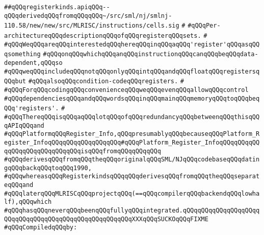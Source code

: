 \label{src/lib/compiler/back/low/code/registerkinds.api}
\verb|##qQQqregisterkinds.apiqQQq--qQQqderivedqQQqfromqQQqqQQq~/src/sml/nj/smlnj-110.58/new/new/src/MLRISC/instructions/cells.sig|\newline
\verb|#|\newline
\verb|#qQQqPer-architectureqQQqdescriptionqQQqofqQQqregisterqQQqsets.|\newline
\verb|#|\newline
\verb|#qQQqWeqQQqareqQQqinterestedqQQqhereqQQqinqQQqaqQQq'register'qQQqasqQQqsomething|\newline
\verb|#qQQqonqQQqwhichqQQqanqQQqinstructionqQQqcanqQQqbeqQQqdata-dependent,qQQqso|\newline
\verb|#qQQqweqQQqincludeqQQqnotqQQqonlyqQQqintqQQqandqQQqfloatqQQqregistersqQQqbut|\newline
\verb|#qQQqalsoqQQqcondition-codeqQQqregisters.|\newline
\verb|#|\newline
\verb|#qQQqForqQQqcodingqQQqconvenienceqQQqweqQQqevenqQQqallowqQQqcontrol|\newline
\verb|#qQQqdependenciesqQQqandqQQqwordsqQQqinqQQqmainqQQqmemoryqQQqtoqQQqbeqQQq'registers'.|\newline
\verb|#|\newline
\verb|#qQQqThereqQQqisqQQqaqQQqlotqQQqofqQQqredundancyqQQqbetweenqQQqthisqQQqAPIqQQqand|\newline
\verb|#qQQqPlatformqQQqRegister_Info,qQQqpresumablyqQQqbecauseqQQqPlatform_Register_InfoqQQqqQQqqQQqqQQqqQQq#qQQqPlatform_Register_InfoqQQqqQQqqQQqqQQqqQQqqQQqqQQqqQQqisqQQqfromqQQqqQQqqQQq|\newline
\verb|#qQQqderivesqQQqfromqQQqtheqQQqoriginalqQQqSML/NJqQQqcodebaseqQQqdatingqQQqbackqQQqtoqQQq1990,|\newline
\verb|#qQQqwhereasqQQqRegisterkindsqQQqqQQqderivesqQQqfromqQQqtheqQQqseparateqQQqand|\newline
\verb|#qQQqlaterqQQqMLRISCqQQqprojectqQQq(==qQQqcompilerqQQqbackendqQQqlowhalf),qQQqwhich|\newline
\verb|#qQQqhasqQQqneverqQQqbeenqQQqfullyqQQqintegrated.qQQqqQQqqQQqqQQqqQQqqQQqqQQqqQQqqQQqqQQqqQQqqQQqqQQqqQQqXXXqQQqSUCKOqQQqFIXME|\newline
\newline
\verb|#qQQqCompiledqQQqby:|\newline
